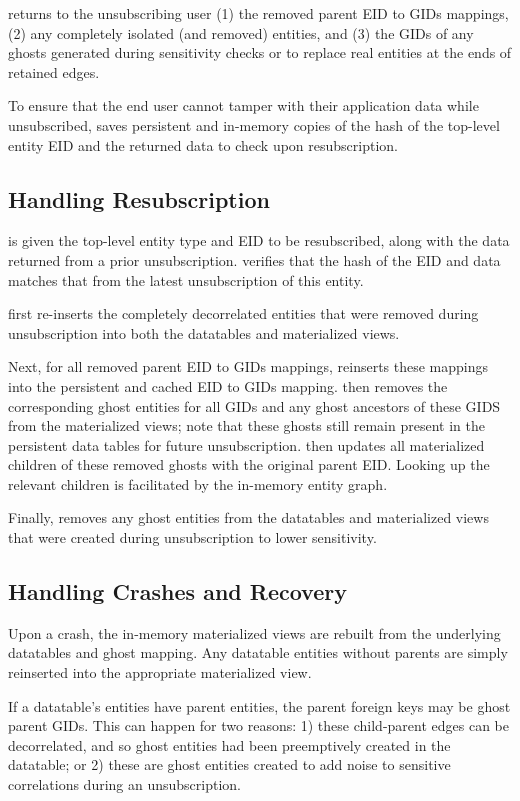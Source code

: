 \sys returns to the unsubscribing user (1) the removed parent EID to GIDs mappings, (2) any
completely isolated (and removed) entities,
and (3) the GIDs of any ghosts generated during sensitivity checks or to replace real
entities at the ends of retained edges.

To ensure that the end user cannot tamper with their application data while unsubscribed, \sys saves
persistent and in-memory copies of the hash of the top-level entity EID and the returned data to
check upon resubscription.

\subsection{Handling Resubscription}
\sys is given the top-level entity type and EID to be resubscribed, along with the data returned
from a prior unsubscription.
\sys verifies that the hash of the EID and data matches that from the latest unsubscription of
this entity.

\sys first re-inserts the completely decorrelated entities that were removed during unsubscription
into both the datatables and materialized views. 

Next, for all removed parent EID to GIDs mappings, \sys reinserts these mappings into the
persistent and cached EID to GIDs mapping.
\sys then removes the corresponding ghost entities for all GIDs and any ghost ancestors of these
GIDS from the materialized views; note that these ghosts still remain present in the
persistent data tables for future unsubscription.
\sys then updates all materialized children of these removed ghosts with the original parent EID. Looking up the relevant
children is facilitated by the in-memory entity graph. 

Finally, \sys removes any
ghost entities from the datatables and materialized views that were created during unsubscription to
lower sensitivity.

\subsection{Handling Crashes and Recovery}
Upon a crash, the in-memory materialized views are rebuilt from the underlying datatables and ghost
mapping. Any datatable entities without parents are simply reinserted into the appropriate
materialized view. 

If a datatable's entities have parent entities, the parent foreign keys may be ghost parent GIDs. 
This can happen for two reasons: 1) these child-parent edges can be decorrelated, and so ghost
entities had been preemptively created in the datatable; or 2) these are ghost entities created to
add noise to sensitive correlations during an unsubscription. 

